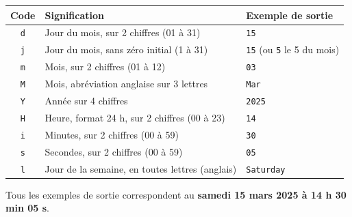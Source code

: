 \documentclass[11pt]{article}
\begin{document}
\begin{propriete}
\begin{center}
\begin{tabularx}{\linewidth}{|c|X|l|}
\hline
\rowcolor{popblueL} \textbf{Code} & \textbf{Signification} & \textbf{Exemple de sortie} \\
\hline
\texttt{d} & Jour du mois, sur 2 chiffres (01 à 31) & \texttt{15} \\
\hline
\texttt{j} & Jour du mois, sans zéro initial (1 à 31) & \texttt{15} (ou \texttt{5} le 5 du mois) \\
\hline
\texttt{m} & Mois, sur 2 chiffres (01 à 12) & \texttt{03} \\
\hline
\texttt{M} & Mois, abréviation anglaise sur 3 lettres & \texttt{Mar} \\
\hline
\texttt{Y} & Année sur 4 chiffres & \texttt{2025} \\
\hline
\texttt{H} & Heure, format 24 h, sur 2 chiffres (00 à 23) & \texttt{14} \\
\hline
\texttt{i} & Minutes, sur 2 chiffres (00 à 59) & \texttt{30} \\
\hline
\texttt{s} & Secondes, sur 2 chiffres (00 à 59) & \texttt{05} \\
\hline
\texttt{l} & Jour de la semaine, en toutes lettres (anglais) & \texttt{Saturday} \\
\hline
\end{tabularx}
\end{center}
Tous les exemples de sortie correspondent au \textbf{samedi 15 mars 2025 à 14 h 30 min 05 s}.
\end{propriete}
\end{document}
